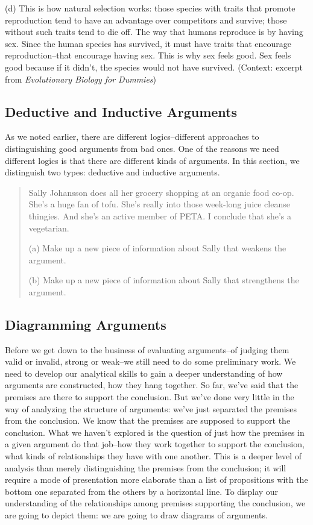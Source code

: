 (d) This is how natural selection works: those species with traits that promote reproduction
tend to have an advantage over competitors and survive; those without such traits tend to
die off. The way that humans reproduce is by having sex. Since the human species has
survived, it must have traits that encourage reproduction--that encourage having sex. This
is why sex feels good. Sex feels good because if it didn't, the species would not have
survived. (Context: excerpt from \emph{Evolutionary Biology for Dummies})

\subsection{Deductive and Inductive Arguments}

As we noted earlier, there are different logics--different approaches to distinguishing good
arguments from bad ones. One of the reasons we need different logics is that there are different
kinds of arguments. In this section, we distinguish two types: deductive and inductive arguments.

\begin{quote}
Sally Johansson does all her grocery shopping at an organic food co-op. She's a huge fan
of tofu. She's really into those week-long juice cleanse thingies. And she's an active
member of PETA. I conclude that she's a vegetarian.

(a) Make up a new piece of information about Sally that weakens the argument.

(b) Make up a new piece of information about Sally that strengthens the argument.
\end{quote}

\subsection{Diagramming Arguments}
Before we get down to the business of evaluating arguments--of judging them valid or invalid,
strong or weak--we still need to do some preliminary work. We need to develop our analytical
skills to gain a deeper understanding of how arguments are constructed, how they hang together.
So far, we've said that the premises are there to support the conclusion. But we've done very little
in the way of analyzing the structure of arguments: we've just separated the premises from the
conclusion. We know that the premises are supposed to support the conclusion. What we haven't
explored is the question of just how the premises in a given argument do that job--how they work
together to support the conclusion, what kinds of relationships they have with one another. This is
a deeper level of analysis than merely distinguishing the premises from the conclusion; it will
require a mode of presentation more elaborate than a list of propositions with the bottom one
separated from the others by a horizontal line. To display our understanding of the relationships
among premises supporting the conclusion, we are going to depict them: we are going to draw
diagrams of arguments.

